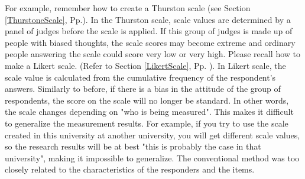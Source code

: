 \documentclass{ltjsbook}
\begin{document}
For example, remember how to create a Thurston scale (see Section \ref{ThurstoneScale}, Pp.\pageref{ThurstoneScale}). In the Thurston scale, scale values are determined by a panel of judges before the scale is applied. If this group of judges is made up of people with biased thoughts, the scale scores may become extreme and ordinary people answering the scale could score very low or very high.
Please recall how to make a Likert scale. (Refer to Section \ref{LikertScale}, Pp. \pageref{LikertScale}). In Likert scale, the scale value is calculated from the cumulative frequency of the respondent's answers. Similarly to before, if there is a bias in the attitude of the group of respondents, the score on the scale will no longer be standard.
In other words, the scale changes depending on "who is being measured". This makes it difficult to generalize the measurement results. For example, if you try to use the scale created in this university at another university, you will get different scale values, so the research results will be at best "this is probably the case in that university", making it impossible to generalize.
The conventional method was too closely related to the characteristics of the responders and the items.
\end{document}
